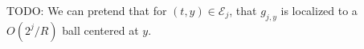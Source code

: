 TODO: We can pretend that for $(t,y) \in \mathcal{E}_j$, that $g_{j,y}$ is localized to a $O(2^j / R)$ ball centered at $y$.




\begin{comment}
Now let $\mathcal{B}_R$ denote a maximal $\sim 1/R$ separated subset of $\text{supp}_x(a)$. Then, by the uncertainty principle, we can find smooth functions $\{ \chi_{R,x} \}$ adapted to the family of $O(R)$ balls with centers in $\mathcal{B}_R$, and constants $\{ m_x \}$ such that
%
\[ K_{R,t}(x,y) = \sum_{x_0 \in \mathcal{B}_R} m_{x_0} \chi_{R,x_0}(x) K_{R,t}(x,y), \]
%
where $K_{R,t,x_0}(x,y) = $

 We perform a further decomposition, writing
%
\[ II_{W,R} = \sum_{t_0 \in \mathcal{T}_R} \sum_{x_0 \in \mathcal{B}_R} c_{t_0,x_0} II_{W,R,t_0,x_0}, \]
%
where
%
\[ II_{W,R,t_0,x_0} f(x) = \int \int_U \eta_{R,t_0}(t) \chi_{R,x_0}(x) K_{R,t}(x,y) f(y)\; dy\; dt, \]
%
\end{comment}

